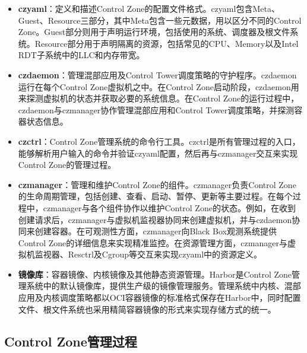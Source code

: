 \begin{itemize}

    \item \textbf{czyaml}：定义和描述Control Zone的配置文件格式。czyaml包含Meta、Guest、Resource三部分，其中Meta包含一些元数据，用以区分不同的Control Zone。Guest部分则用于声明运行环境，包括使用的系统、调度器及根文件系统。Resource部分用于声明隔离的资源，包括常见的CPU、Memory以及Intel RDT子系统中的LLC和内存带宽。

    \item \textbf{czdaemon}：管理混部应用及Control Tower调度策略的守护程序。czdaemon运行在每个Control Zone虚拟机之中。在Control Zone启动阶段，czdaemon用来探测虚拟机的状态并获取必要的系统信息。在Control Zone的运行过程中，czdaemon与czmanager协作管理混部应用和Control Tower调度策略，并探测容器状态信息。

    \item \textbf{czctrl}：Control Zone管理系统的命令行工具。czctrl是所有管理过程的入口，能够解析用户输入的命令并验证czyaml配置，然后再与czmanager交互来实现Control Zone的管理过程。
    
    \item \textbf{czmanager}：管理和维护Control Zone的组件。czmanager负责Control Zone的生命周期管理，包括创建、查看、启动、暂停、更新等主要过程。在每个过程中，czmanager与各个组件协作以维护Control Zone的状态。例如，在收到创建请求后，czmanager与虚拟机监视器协同来创建虚拟机，并与czdaemon协同来创建容器。在可观测性方面，czmanager向Black Box观测系统提供Control Zone的详细信息来实现精准监控。在资源管理方面，czmanager与虚拟机监视器、Resctrl及Cgroup等交互来实现czyaml中的资源定义。

    \item \textbf{镜像库}：容器镜像、内核镜像及其他静态资源管理。Harbor\citep{harbor}是Control Zone管理系统中的默认镜像库，提供生产级的镜像管理服务。管理系统中内核、混部应用及内核调度策略都以OCI容器镜像的标准格式保存在Harbor中，同时配置文件、根文件系统也采用精简容器镜像的形式来实现存储方式的统一。

\end{itemize}

\subsection{Control Zone管理过程}



